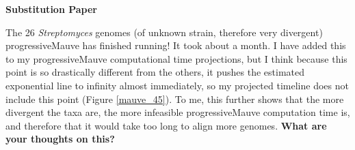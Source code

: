 \documentclass[12pt]{article}
\newcommand{\smel}{\textit{S.\,meliloti}\xspace}
\newcommand{\p}{progressiveMauve\xspace}
\newcommand{\strep}{\textit{Streptomyces}\xspace}
\newcommand{\ecol}{\textit{E.\,coli}\xspace}
\newcommand{\ecoli}{\textit{Escherichia coli}\xspace}
\newcommand{\pa}{pSymA\xspace}
\newcommand{\dn}{\textit{dN}\xspace}
\begin{document}

\textbf{Substitution Paper}

The 26 \strep genomes (of unknown strain, therefore very divergent) \p has finished running! It took about a month.
I have added this to my \p computational time projections, but I think because this point is so drastically different from the others, it pushes the estimated exponential line to infinity almost immediately, so my projected timeline does not include this point (Figure \ref{mauve_45}).
To me, this further shows that the more divergent the taxa are, the more infeasible \p computation time is, and therefore that it would take too long to align more genomes.
\textbf{What are your thoughts on this?} 
\end{document}
